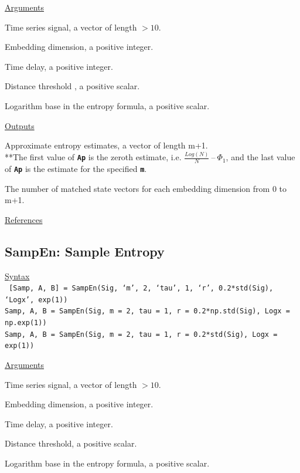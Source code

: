 \documentclass[12pt, a4paper, titlepage, openany]{book}
\begin{document}
\noindent \ul{Arguments}
\begin{description}[labelsep=1cm, labelwidth=2cm, nosep,,style=multiline,leftmargin=3cm]\footnotesize
\item[\texttt{Sig}]		Time series signal, a vector of length $> 10$.
\item[\texttt{m}]		Embedding dimension, a positive integer.
\item[\texttt{tau}]		Time delay, a positive integer.
\item[\texttt{r}]		Distance threshold , a positive scalar.
\item[\texttt{Logx}]	Logarithm base in the entropy formula, a positive scalar.
\end{description}

\noindent \ul{Outputs}
\begin{description}[labelsep=1cm, labelwidth=2cm, nosep, style=multiline,leftmargin=3cm]\footnotesize
\item[\texttt{Ap}]		Approximate entropy estimates, a vector of length m+1.\\
			**The first value of \texttt{\textbf{Ap}} is the zeroth estimate, i.e. $\frac{Log(N)}{N} \ – \ \Phi_1$,
				and the last value of \texttt{\textbf{Ap}} is the estimate for the specified \texttt{\textbf{m}}.
\item[\texttt{Phi}]		The number of matched state vectors for each embedding dimension from 0 to m+1.
\end{description}

\noindent \ul{References}\hspace{1cm}
\cite{Ap1}



\newpage
\subsection{\normalsize SampEn: \hspace{15mm} Sample Entropy}
\noindent\ul{Syntax} \vspace{6mm} \\ \noindent \texttt{\footnotesize
[Samp, A, B] = SampEn(Sig, ‘m’, 2, ‘tau’, 1, ‘r’, 0.2*std(Sig), ‘Logx’, exp(1)) \\
Samp, A, B   = SampEn(Sig, m = 2, tau = 1, r = 0.2*np.std(Sig), Logx = np.exp(1)) \\
Samp, A, B   = SampEn(Sig, m = 2, tau = 1, r = 0.2*std(Sig), Logx = exp(1))}

\noindent \ul{Arguments}
\begin{description}[labelsep=1cm, labelwidth=2cm, nosep, style=multiline,leftmargin=3cm]\footnotesize
\item[\texttt{Sig}]		Time series signal, a vector of length $> 10$.
\item[\texttt{m}]		Embedding dimension, a positive integer.
\item[\texttt{tau}]		Time delay, a positive integer.
\item[\texttt{r}]		Distance threshold, a positive scalar.
\item[\texttt{Logx}]	Logarithm base in the entropy formula, a positive scalar.
\end{description}
\end{document}
